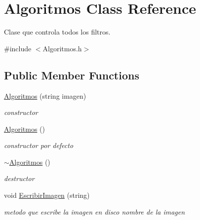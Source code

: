 \hypertarget{class_algoritmos}{}\section{Algoritmos Class Reference}
\label{class_algoritmos}


Clase que controla todos los filtros.  




{\ttfamily \#include $<$Algoritmos.\+h$>$}

\subsection*{Public Member Functions}
\begin{DoxyCompactItemize}
\item 
\mbox{\label{class_algoritmos_a5478c9cf10d05bdad9a6978c2e7cea25}} 
\hyperlink{class_algoritmos_a5478c9cf10d05bdad9a6978c2e7cea25}{Algoritmos} (string imagen)
\begin{DoxyCompactList}\small\item\em constructor \end{DoxyCompactList}\item 
\mbox{\label{class_algoritmos_afd740618621d027191776ddb2f0f24ae}} 
\hyperlink{class_algoritmos_afd740618621d027191776ddb2f0f24ae}{Algoritmos} ()
\begin{DoxyCompactList}\small\item\em constructor por defecto \end{DoxyCompactList}\item 
\mbox{\label{class_algoritmos_a3ad355d75fa022dbefcd7ccea9fb6bb3}} 
\hyperlink{class_algoritmos_a3ad355d75fa022dbefcd7ccea9fb6bb3}{$\sim$\+Algoritmos} ()
\begin{DoxyCompactList}\small\item\em destructor \end{DoxyCompactList}\item 
\mbox{\label{class_algoritmos_abb864c90d2268ca179f5c141182b3af1}} 
void \hyperlink{class_algoritmos_abb864c90d2268ca179f5c141182b3af1}{Escribir\+Imagen} (string)
\begin{DoxyCompactList}\small\item\em metodo que escribe la imagen en disco  nombre de la imagen \end{DoxyCompactList}\item 

\end{DoxyCompactItemize}
